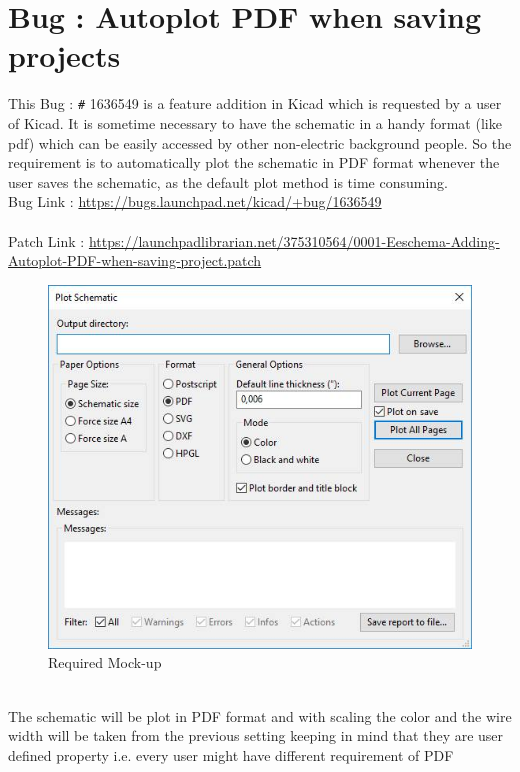 \documentclass[12pt,a4paper]{report}
\begin{document}
\section{Bug : Autoplot PDF when saving projects}
This Bug : \verb!#! 1636549 is a feature addition in Kicad which is requested by a user of Kicad. It is sometime necessary to have the schematic in a handy format (like pdf) which can be easily accessed by other non-electric background people. So the requirement is to automatically plot the schematic in PDF format whenever the user saves the schematic, as the default plot method is time consuming.
\vspace{3mm}
\\
Bug Link : \url{https://bugs.launchpad.net/kicad/+bug/1636549}
\\
\\
Patch Link : \url{https://launchpadlibrarian.net/375310564/0001-Eeschema-Adding-Autoplot-PDF-when-saving-project.patch}
\begin{figure}[h]
	\centering
	\includegraphics[scale=0.4]{ki_bug_1}
	\caption{Required Mock-up}
\end{figure}
\\
The schematic will be plot in PDF format and with scaling the color and the wire width will be taken from the previous setting keeping in mind that they are user defined property i.e. every user might have different requirement of PDF
\end{document}
